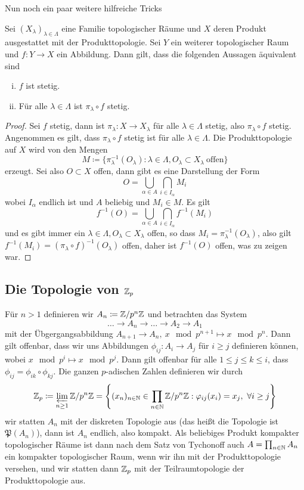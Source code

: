 Nun noch ein paar weitere hilfreiche Tricks
\begin{lemma}
    Sei $(X_\lambda)_{\lambda\in \Lambda}$ eine Familie topologischer Räume und $X$ deren Produkt ausgestattet mit der Produkttopologie. Sei $Y$ ein weiterer topologischer Raum und $f:Y\to X$ ein Abbildung. Dann gilt, dass die folgenden Aussagen äquivalent sind
    \begin{enumerate}[(i)]
        \item $f$ ist stetig.
        \item Für alle $\lambda\in \Lambda$ ist $\pi_\lambda\circ f$ stetig.
    \end{enumerate}
\end{lemma}
\begin{proof}
    Sei $f$ stetig, dann ist $\pi_\lambda:X\to X_\lambda$ für alle $\lambda \in \Lambda$ stetig, also $\pi_\lambda\circ f$ stetig.
    Angenommen es gilt, dass $\pi_\lambda \circ f$ stetig ist für alle $\lambda\in \Lambda$. Die Produkttopologie auf $X$ wird von den Mengen \[
        M\coloneqq \{ \pi_\lambda^{-1}(O_\lambda):\lambda\in \Lambda, O_\lambda\subset X_\lambda \ \text{offen}\} 
        \]
        erzeugt. Sei also $O\subset X$ offen, dann gibt es eine Darstellung der Form
        \[
        O = \bigcup_{\alpha\in A}\bigcap_{i\in I_\alpha} M_i    
        \]
        wobei $I_\alpha$ endlich ist und $A$ beliebig und $M_i\in M$. Es gilt
        \[
        f^{-1}(O) =     \bigcup_{\alpha\in A}\bigcap_{i\in I_\alpha} f^{-1}(M_i)
        \]
        und es gibt immer ein $\lambda \in \Lambda, O_\lambda\subset X_\lambda$ offen, so dass $M_i = \pi_\lambda^{-1}(O_\lambda)$, also gilt $f^{-1}(M_i) = (\pi_\lambda\circ f)^{-1}(O_\lambda)$ offen, daher ist $f^{-1}(O)$ offen, was zu zeigen war.
\end{proof}
\subsection*{Die Topologie von $\mathbb{Z}_p$}
Für $n>1$ definieren wir $A_n \coloneqq \mathbb{Z}/p^n\mathbb{Z}$ und betrachten das System 
\[
\ldots \to A_n \to \ldots \to A_2 \to A_1    
\]
mit der Übgergangsabbildung $A_{n+1}\to A_n, \ x\mod p^{n+1}\mapsto x\mod p^n$. Dann gilt offenbar, dass wir uns Abbildungen $\phi_{ij}:A_i\to A_j$ für $i\ge j$ definieren können, wobei $x\mod p^i \mapsto x\mod p^j$. Dann gilt offenbar für alle $1\le j\le k\le i$, dass $\phi_{ij}=\phi_{ik}\circ \phi_{kj}$. Die ganzen $p$-adischen Zahlen definieren wir durch
\[
    \mathbb{Z}_p\coloneqq\varprojlim_{n\ge 1} \mathbb{Z}/p^n\mathbb{Z} =
    \left\{
        (x_n)_{n\in \mathbb{N}} \in \prod_{n\in \mathbb{N}}\mathbb{Z}/p^n\mathbb{Z} : \varphi_{ij}(x_i) = x_j, \ \forall i\ge j
    \right\}
\]
wir statten $A_n$ mit der diskreten Topologie aus (das heißt die Topologie ist $\mathfrak{P}(A_n)$), dann ist $A_n$ endlich, also kompakt. Als beliebiges Produkt kompakter topologischer Räume ist dann nach dem Satz von Tychonoff auch $A=\prod_{n\in \mathbb{N}}A_n$ ein kompakter topologischer Raum, wenn wir ihn mit der Produkttopologie versehen, und  
wir statten dann $\mathbb{Z}_p$ mit der Teilraumtopologie der Produkttopologie aus.
